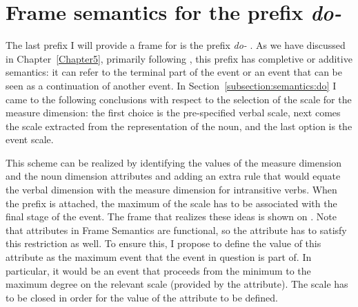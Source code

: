 \clearpage

\section{Frame semantics for the prefix \textit{do-}  }\label{section:frame:do}
The last prefix I will provide a frame for is the prefix \textit{do-}  . As we have discussed in Chapter~\ref{Chapter5}, primarily following \citet{Kagan:book}, this prefix has completive  or additive semantics: it can refer to the terminal part of the event or an event that can be seen as a continuation of another event. In Section~\ref{subsection:semantics:do} I came to the following conclusions with respect to the selection of the scale for the measure dimension: the first choice is the pre-specified verbal scale, next comes the scale extracted from the representation of the noun, and the last option is the event scale. 

This scheme can be realized by identifying the values of the measure dimension and the noun dimension attributes and adding an extra rule that would equate the verbal dimension with the measure dimension for intransitive verbs. When the prefix is attached, the maximum of the scale has to be associated with the final stage of the event. The frame that realizes these ideas is shown on . Note that attributes in Frame Semantics are functional, so the attribute \PARTOF has to satisfy this restriction as well. To ensure this, I propose to define the value of this attribute as  the maximum event that the event in question is part of. In particular, it would be an event that proceeds from the minimum to the maximum degree on the relevant scale (provided by the \MDIM attribute). The scale has to be closed in order for the value of the \PARTOF attribute to be defined.

